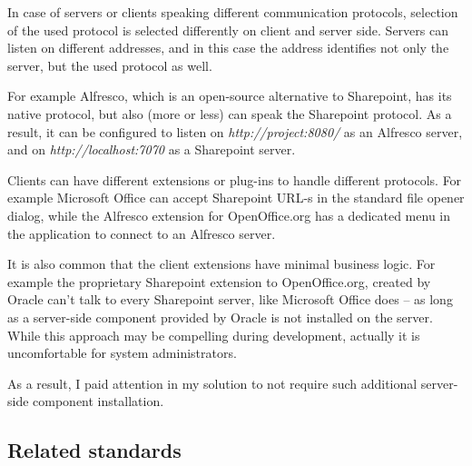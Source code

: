 In case of servers or clients speaking different communication protocols,
selection of the used protocol is selected differently on client and server
side. Servers can listen on different addresses, and in this case the address
identifies not only the server, but the used protocol as well.

For example Alfresco\cite{alfresco}, which is an open-source alternative to
Sharepoint, has its native protocol, but also (more or less) can speak the
Sharepoint protocol. As a result, it can be configured to listen on
\emph{http://project:8080/} as an Alfresco server, and on
\emph{http://localhost:7070} as a Sharepoint server.

Clients can have different extensions or plug-ins to handle different
protocols. For example Microsoft Office can accept Sharepoint URL-s in the
standard file opener dialog, while the Alfresco extension for OpenOffice.org
has a dedicated menu in the application to connect to an Alfresco server.

It is also common that the client extensions have minimal business logic. For
example the proprietary Sharepoint extension to OpenOffice.org, created by
Oracle can't talk to every Sharepoint server, like Microsoft Office does -- as
long as a server-side component provided by Oracle is not installed on the
server. While this approach may be compelling during development, actually it
is uncomfortable for system administrators.

As a result, I paid attention in my solution to not require such additional
server-side component installation.

\subsection{Related standards}
